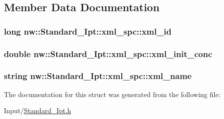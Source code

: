 \subsection{Member Data Documentation}
\hypertarget{structnw_1_1_standard___ipt_1_1xml__spc_a2928ff822d6fd953e125ec3d8dd741d9}{
\subsubsection[{xml\+\_\+id}]{\setlength{\rightskip}{0pt plus 5cm}long nw\+::\+Standard\+\_\+\+Ipt\+::xml\+\_\+spc\+::xml\+\_\+id}}\label{structnw_1_1_standard___ipt_1_1xml__spc_a2928ff822d6fd953e125ec3d8dd741d9}
\hypertarget{structnw_1_1_standard___ipt_1_1xml__spc_a1ae4e41f07db5f76deb50901ee12dc2e}{
\subsubsection[{xml\+\_\+init\+\_\+conc}]{\setlength{\rightskip}{0pt plus 5cm}double nw\+::\+Standard\+\_\+\+Ipt\+::xml\+\_\+spc\+::xml\+\_\+init\+\_\+conc}}\label{structnw_1_1_standard___ipt_1_1xml__spc_a1ae4e41f07db5f76deb50901ee12dc2e}
\hypertarget{structnw_1_1_standard___ipt_1_1xml__spc_a2b1626e44822991931ca0dfd7257c95f}{
\subsubsection[{xml\+\_\+name}]{\setlength{\rightskip}{0pt plus 5cm}string nw\+::\+Standard\+\_\+\+Ipt\+::xml\+\_\+spc\+::xml\+\_\+name}}\label{structnw_1_1_standard___ipt_1_1xml__spc_a2b1626e44822991931ca0dfd7257c95f}


The documentation for this struct was generated from the following file\+:\begin{DoxyCompactItemize}
\item 
Input/\hyperlink{_standard___ipt_8h}{Standard\+\_\+\+Ipt.\+h}\end{DoxyCompactItemize}

